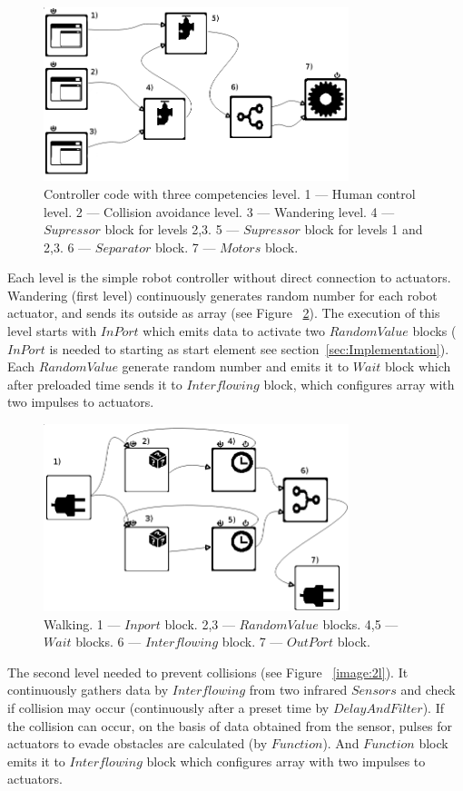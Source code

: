 \documentclass[conference,compsoc]{IEEEtran}
\begin{document}
\begin{figure}[ht]
	\centering
	\includegraphics[width=3.5in]{3layers.png}
	\caption{Controller code with three competencies level. 1 --- Human control level. 2 --- Collision avoidance level. 3 --- Wandering level. 4 --- $Supressor$ block for levels 2,3. 5 --- $Supressor$ block for levels 1 and  2,3. 6 --- $Separator$ block.  7 --- $Motors$ block.}
	\label{image:3layers}
\end{figure}

Each level is the simple robot controller without direct connection to actuators. Wandering (first level) continuously generates random number for each robot actuator, and sends its outside as array (see Figure ~\ref{image:1l}). The execution of this level starts with $InPort$ which emits data to activate two $RandomValue$ blocks ($InPort$ is needed to starting as start element see section~\ref{sec:Implementation}). Each $RandomValue$ generate random number and emits it to $Wait$ block which after preloaded time sends it to $Interflowing$ block, which configures array with two impulses to actuators.

\begin{figure}[ht]
	\centering
	\includegraphics[width=3.5in]{1l.png}
	\caption{Walking. 1 --- $Inport$ block.  2,3 --- $RandomValue$ blocks. 4,5 --- $Wait$ blocks. 6 --- $Interflowing$ block. 7 --- $OutPort$ block.}
	\label{image:1l}
\end{figure}

The second level needed to prevent collisions (see Figure ~\ref{image:2l}). It continuously gathers data by $Interflowing$ from two infrared $Sensors$ and check if collision may occur (continuously after a preset time by $DelayAndFilter$). If the collision can occur, on the basis of data obtained from the sensor, pulses for actuators to evade obstacles are calculated (by $Function$). And $Function$ block emits it to $Interflowing$ block which configures array with two impulses to actuators.
\end{document}

